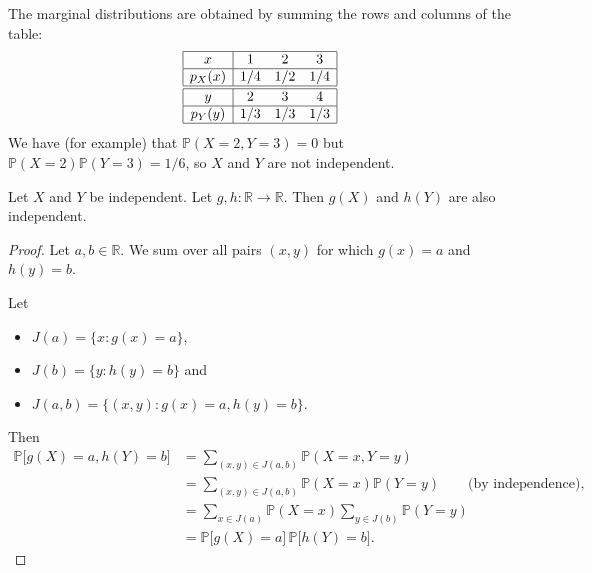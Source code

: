 \documentclass[lecture]{csm}
\newcommand{\R}{\mathbb{R}}
\newcommand{\prob}{\mathbb{P}}
\def\it{\item}
\def\bit{\begin{itemize}}
\def\eit{\end{itemize}}
\begin{document}
\begin{solution}
The marginal distributions are obtained by summing the rows and columns of the table:
\[\begin{array}{|c|ccc|}\hline
x			& 1		& 2		& 3	\\ \hline
p_X(x)		& 1/4	& 1/2	& 1/4	\\ \hline \hline
y			& 2		& 3		& 4 	\\ \hline			
p_Y(y)		& 1/3	& 1/3	& 1/3	\\ \hline
\end{array}\]
We have (for example) that $\prob(X=2,Y=3)=0$ but $\prob(X=2)\prob(Y=3) = 1/6$, so $X$ and $Y$ are not independent.
\end{solution}

\begin{theorem}
Let $X$ and $Y$ be independent. Let $g,h:\R\to\R$. Then $g(X)$ and $h(Y)$ are also independent.
\end{theorem}
\begin{proof}
Let $a,b\in\R$. We sum over all pairs $(x,y)$ for which $g(x)=a$ and $h(y)=b$.
\par
Let 
\bit
\it $J(a)=\{x:g(x)=a\}$,
\it $J(b)=\{y:h(y)=b\}$ and 
\it $J(a,b) = \{(x,y):g(x)=a,h(y)=b\}$.
\eit
Then
\begin{align*}
\prob\big[g(X)=a,h(Y)=b\big]
	& = \sum_{(x,y)\in J(a,b)}\prob(X=x,Y=y) \\
	& = \sum_{(x,y)\in J(a,b)}\prob(X=x)\prob(Y=y) \qquad\text{(by independence),}\\
	& = \sum_{x\in J(a)}\prob(X=x) \sum_{y\in J(b)}\prob(Y=y) \\
	& = \prob\big[g(X)=a\big]\,\prob\big[h(Y)=b\big].
\end{align*}
\end{proof}

\end{document}
